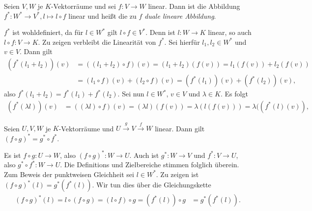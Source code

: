 \documentclass[../../main.tex]{subfiles}
\begin{document}
\begin{propdef}\label{13.1.8}
	Seien $V,W$ je $K$-Vektorräume und sei $f: V\to W$ linear. Dann ist die Abbildung $f^*: W^*\to V^*, l\mapsto l\circ f$ linear und heißt die zu $f$ \emph{duale lineare Abbildung}.
\end{propdef}
\begin{cproof}
	$f^*$ ist wohldefiniert, da für $l\in W^*$ gilt $l\circ f\in V^*$. Denn ist $l: W\to K$ linear, so auch $l\circ f: V\to K$. Zu zeigen verbleibt die Linearität von $f^*$. Sei hierfür $l_1,l_2\in W^*$ und $v\in V$. Dann gilt
	\begin{align*}
		(f^*(l_1+l_2))(v)&=((l_1+l_2)\circ f)(v)=(l_1+l_2)(f(v))=l_1(f(v))+l_2(f(v))\\
		&=(l_1\circ f)(v)+(l_2\circ f)(v)=(f^*(l_1))(v)+(f^*(l_2))(v),
	\end{align*}
	also $f^*(l_1+l_2)=f^*(l_1)+f^*(l_2)$.	Sei nun $l\in W^*$, $v\in V$ und $\lambda\in K$. Es folgt
	\begin{align*}
		(f^*(\lambda l))(v)&=((\lambda l)\circ f)(v)=(\lambda l)(f(v))=\lambda(l(f(v)))=\lambda((f^*(l)(v)),
	\end{align*}
\end{cproof}
	
\begin{pro}\label{13.1.9}
	Seien $U,V,W$ je $K$-Vektorräume und $U\stackrel{g}{\to}V\stackrel{f}{\to}W$ linear. Dann gilt $(f\circ g)^*=g^*\circ f^*$.
\end{pro}
\begin{cproof}
	Es ist $f\circ g: U\to W$, also $(f\circ g)^*: W\to U$. Auch ist $g^*: W\to V$ und $f^*: V\to U$, also $g^*\circ f^*: W\to U$. Die Definitions und Zielbereiche stimmen folglich überein. Zum Beweis der punktweisen Gleichheit sei $l\in W^*$. Zu zeigen ist $(f\circ g)^*(l)=g^*(f^*(l))$. Wir tun dies über die Gleichungskette
	\begin{align*}
		(f\circ g)^*(l)=l\circ (f\circ g)=(l\circ f)\circ g=(f^*(l))\circ g
		&=g^*(f^*(l)).
	\end{align*}
\end{cproof}
\end{document}
